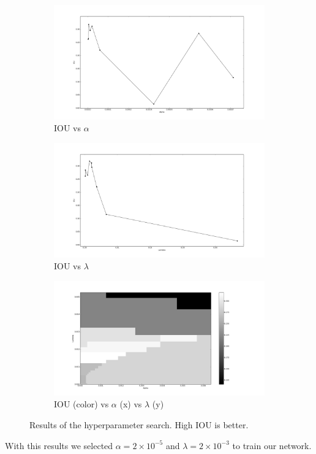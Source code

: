 \begin{figure}[h]
	\centering
	\begin{subfigure}{0.32\textwidth}
		\centering
                \includegraphics[width=\textwidth]{plots/hs4_alpha.png}
         \caption{IOU vs $\alpha$}
	\end{subfigure}
	\begin{subfigure}{0.32\textwidth}
		\centering
                \includegraphics[width=\textwidth]{plots/hs4_lambda.png}
         \caption{IOU vs $\lambda$}
	\end{subfigure}
	\begin{subfigure}{0.32\textwidth}
		\centering
                \includegraphics[width=\textwidth]{plots/hs4_pcolor.png}
         \caption{IOU (color) vs $\alpha$ (x) vs $\lambda$ (y)}
	\end{subfigure}
	\caption[Hyperparameter search for Experiment 2]{Results of the hyperparameter search. High IOU is better.}
	 \label{fig:Hs4}
\end{figure}
With this results we selected $\alpha = 2 \times 10^{-5}$ and $\lambda = 2 \times 10^{-3}$ to train our network.

